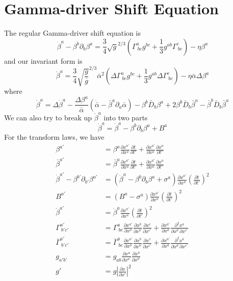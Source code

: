 \documentclass{article}
\begin{document}
\section{Gamma-driver Shift Equation}
The regular Gamma-driver shift equation is
\begin{equation}\label{regular gamma-driver}
{\dot \beta}^{a} - \beta^{b}\partial_{b}\beta^{a} = \frac{3}{4}\sqrt{g}^{2/3}(\Gamma^{a}_{~bc}g^{bc} + \frac{1}{3}g^{ab}\Gamma^{c}_{~bc}) - \eta \beta^{a} 
\end{equation}
and our invariant form is
\begin{equation}\label{invariant gamma-driver}
\mathring{\beta}^{a} = \frac{3}{4}\sqrt{\frac{g}{{\bar g}}}^{2/3}{\bar \alpha}^{2}(\Delta \Gamma^{a}_{~bc}g^{bc} + \frac{1}{3}g^{ab}\Delta\Gamma^{c}_{~bc}) - \eta {\bar \alpha}\Delta\beta^{a}
\end{equation}
where
\[
\mathring{\beta}^{a} =  \Delta {\dot \beta}^{a} -\frac{\Delta \beta^{a}}{{\bar \alpha}}({\dot {\bar \alpha}} - {\bar \beta}^{a}\partial_{a}{\bar \alpha}) - \beta^{b}{\bar D}_{b}\beta^{a} + 2\beta^{b}{\bar D}_{b}{\bar \beta}^{a} - {\bar \beta}^{b}{\bar D}_{b}{\bar \beta}^{a}
\]
We can also try to break up $\mathring{\beta}^{a}$ into two parts
\[
\mathring{\beta}^{a} = {\dot \beta}^{a} - \beta^{b}\partial_{b}\beta^{a} + B^{a}
\]
For the transform laws, we have
\begin{align*}
\beta^{a'} & = \beta^{a}\frac{\partial x^{a'}}{\partial x^{a}}\frac{\partial t}{\partial t'} + \frac{\partial x^{a'}}{\partial x^{a}}\frac{\partial x^{a}}{\partial t'}\\
{\bar \beta}^{a'} & = {\bar\beta}^{a}\frac{\partial x^{a'}}{\partial x^{a}}\frac{\partial t}{\partial t'} + \frac{\partial x^{a'}}{\partial x^{a}}\frac{\partial x^{a}}{\partial t'}\\
{\dot \beta}^{a'} - \beta^{b'}\partial_{b'}\beta^{a'} & = ({\dot \beta}^{a} - \beta^{b}\partial_{b}\beta^{a} + \sigma^{a})\frac{\partial x^{a'}}{\partial x^{a}}\left(\frac{\partial t}{\partial t'}\right)^{2}\\
B^{a'} & = (B^{a} - \sigma^{a})\frac{\partial x^{a'}}{\partial x^{a}}\left(\frac{\partial t}{\partial t'}\right)^{2}\\
\mathring{\beta}^{a'} & = \mathring{\beta}^{a}\frac{\partial x^{a'}}{\partial x^{a}}\left(\frac{\partial t}{\partial t'}\right)^{2}\\
\Gamma^{a'}_{~b'c'} & = \Gamma^{a}_{~bc}\frac{\partial x^{a'}}{\partial x^{a}}\frac{\partial x^{b}}{\partial x^{b'}}\frac{\partial x^{c}}{\partial x^{c'}} + \frac{\partial x^{a'}}{\partial x^{a}}\frac{\partial^{2}x^{a}}{\partial x^{b'}\partial x^{c'}}\\
{\bar\Gamma}^{a'}_{~b'c'} & = {\bar \Gamma}^{a}_{~bc}\frac{\partial x^{a'}}{\partial x^{a}}\frac{\partial x^{b}}{\partial x^{b'}}\frac{\partial x^{c}}{\partial x^{c'}} + \frac{\partial x^{a'}}{\partial x^{a}}\frac{\partial^{2}x^{a}}{\partial x^{b'}\partial x^{c'}}\\
g_{a'b'} & = g_{ab}\frac{\partial x^{a}}{\partial x^{a'}}\frac{\partial x^{b}}{\partial x^{b'}}\\
g' & = g\left|\frac{\partial x}{\partial x'}\right|^{2}
\end{align*}
\end{document}
